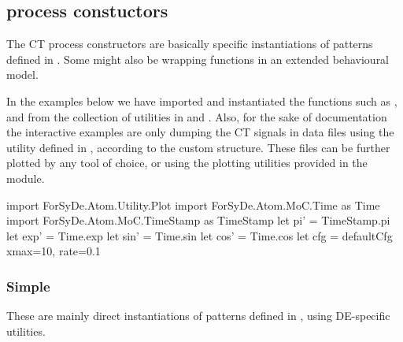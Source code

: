\subsection{ process constuctors}
The CT process constructors are basically specific
 instantiations of patterns defined in . Some
 might also be wrapping functions in an extended behavioural
 model.\par
In the examples below we have imported and instantiated the
 functions such as  ,  and  from the
 collection of utilities in  and
 . Also, for the sake of documentation
 the interactive examples are only dumping the CT signals in data
 files using the  utility defined in
 , according to the custom 
 structure. These files can be further plotted by any tool of
 choice, or using the plotting utilities provided in the
  module.\par
\begin{interactive}
import ForSyDe.Atom.Utility.Plot
import ForSyDe.Atom.MoC.Time as Time
import ForSyDe.Atom.MoC.TimeStamp as TimeStamp
let pi'  = TimeStamp.pi
let exp' = Time.exp
let sin' = Time.sin
let cos' = Time.cos
let cfg  = defaultCfg {xmax=10, rate=0.1}\end{interactive}

\subsubsection{Simple}
These are mainly direct instantiations of patterns defined in
 , using DE-specific utilities.\par

